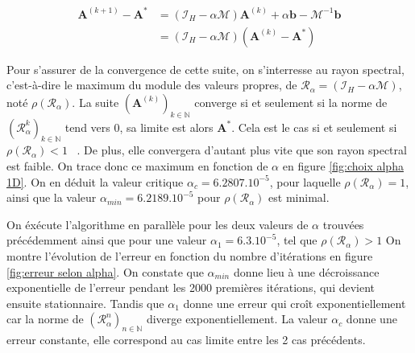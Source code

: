 \documentclass[12pt]{report}
\begin{document}
\begin{equation}
    \begin{aligned}
        \bm{A}^{(k+1)}-\bm{A^*}  &= (\mathcal{I}_H - \alpha \mathcal{M} )  \bm{A}^{(k)} + \alpha\bm{b} - \mathcal {M}^{-1}\bm{b}\\
         &= (\mathcal{I}_H - \alpha \mathcal{M} ) (\bm{A}^{(k)}-\bm{A^*} )
    \end{aligned}
\label{eq:équation récurrence descente gradients v2}
\end{equation}

Pour s'assurer de la convergence de cette suite, on s'interresse au rayon spectral, c'est-à-dire le maximum du module des valeurs propres, de $\mathcal{R}_\alpha = (\mathcal{I}_H - \alpha \mathcal{M} )$, noté $\rho(\mathcal{R}_\alpha)$.
La suite $(\bm{A}^{(k)})_{k\in \mathbb{N}}$ converge si et seulement si la norme de $(\mathcal{R}_\alpha ^k)_{k\in \mathbb{N}}$ tend vers 0, sa limite est alors $\bm A^*$.
Cela est le cas si et seulement si $\rho(\mathcal{R}_\alpha)<1$ ~\cite{WikiRayonSpectral}.
De plus, elle convergera d'autant plus vite que son rayon spectral est faible.
On trace donc ce maximum en fonction de $\alpha$ en figure \ref{fig:choix alpha 1D}. 
On en déduit la valeur critique $\alpha_c = 6.2807.10^{-5}$, pour laquelle $\rho(\mathcal{R}_\alpha)=1$, ainsi que la valeur $\alpha_{min} = 6.2189.10^{-5}$ pour $\rho(\mathcal{R}_\alpha)$ est minimal.

On éxécute l'algorithme en parallèle pour les deux valeurs de $\alpha$ trouvées précédemment ainsi que pour une valeur $\alpha_1 = 6.3.10^{-5}$, tel que $\rho(\mathcal{R}_\alpha)>1$
On montre l'évolution de l'erreur en fonction du nombre d'itérations en figure \ref{fig:erreur selon alpha}. 
On constate que $\alpha_{min}$ donne lieu à une décroissance exponentielle de l'erreur pendant les 2000 premières itérations, qui 
devient ensuite stationnaire. 
Tandis que $\alpha_1$ donne une erreur qui croît exponentiellement car la norme de $(\mathcal{R}_\alpha ^n)_{n\in \mathbb{N}}$ diverge exponentiellement. 
La valeur $\alpha_c$ donne une erreur constante, 
elle correspond au cas limite entre les 2 cas précédents.
\end{document}
